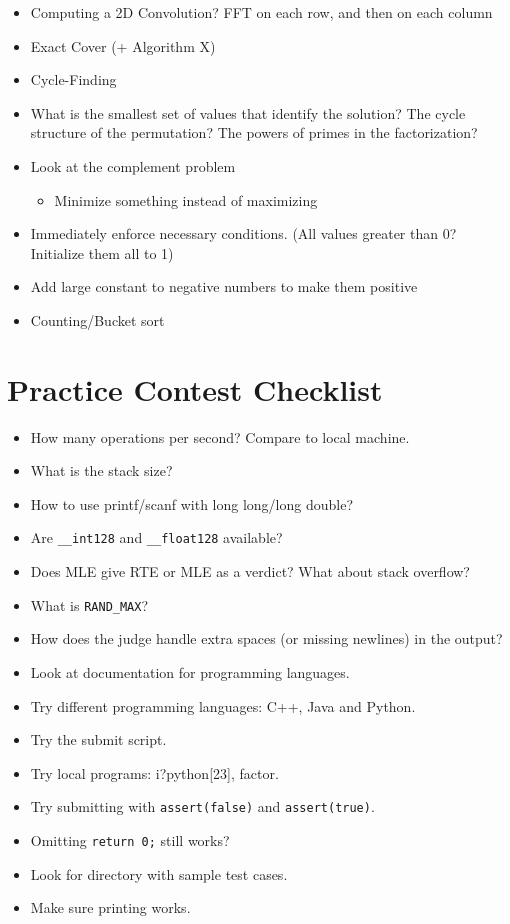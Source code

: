 \documentclass[9pt,a4paper,landscape,oneside]{amsart}
\newenvironment{myitemize}
{\begin{itemize}[leftmargin=.3cm]
	\setlength{\itemsep}{0pt}
	\setlength{\parskip}{0pt}
	\setlength{\parsep}{0pt}     }
{ \end{itemize}                  }
\begin{document}
\begin{multicols*}{3}
\begin{myitemize}
	\item Computing a 2D Convolution? FFT on each row, and then on each column
	\item Exact Cover (+ Algorithm X)
	\item Cycle-Finding
	\item What is the smallest set of values that identify the solution? The cycle structure of the permutation? The powers of primes in the factorization?
	\item Look at the complement problem
		\begin{myitemize}
			\item Minimize something instead of maximizing
		\end{myitemize}
	\item Immediately enforce necessary conditions. (All values greater than 0? Initialize them all to 1)
	\item Add large constant to negative numbers to make them positive
	\item Counting/Bucket sort
\end{myitemize}

\section*{Practice Contest Checklist}
\begin{myitemize}
	\item How many operations per second? Compare to local machine.
	\item What is the stack size?
	\item How to use printf/scanf with long long/long double?
	\item Are \texttt{\_{}\_{}int128} and \texttt{\_{}\_{}float128} available?
	\item Does MLE give RTE or MLE as a verdict? What about stack overflow?
	\item What is \texttt{RAND\_{}MAX}?
	\item How does the judge handle extra spaces (or missing newlines) in the output?
	\item Look at documentation for programming languages.
	\item Try different programming languages: C++, Java and Python.
	\item Try the submit script.
	\item Try local programs: i?python[23], factor.
	\item Try submitting with \texttt{assert(false)} and \texttt{assert(true)}.
	\item Omitting \texttt{return 0;} still works?
	\item Look for directory with sample test cases.
	\item Make sure printing works.
\end{myitemize}

\end{multicols*}
\end{document}
